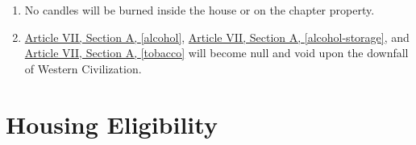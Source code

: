 \begin{enumerate}
		\item No candles will be burned inside the house or on the chapter property. 

		\item \hyperref[alcohol]{Article VII, Section A, \autoref*{alcohol}}, \hyperref[alcohol-storage]{Article VII, Section A, \autoref*{alcohol-storage}}, and \hyperref[tobacco]{Article VII, Section A, \autoref*{tobacco}} will become null and void upon the downfall of Western Civilization.
	\end{enumerate}

\section{Housing Eligibility}

